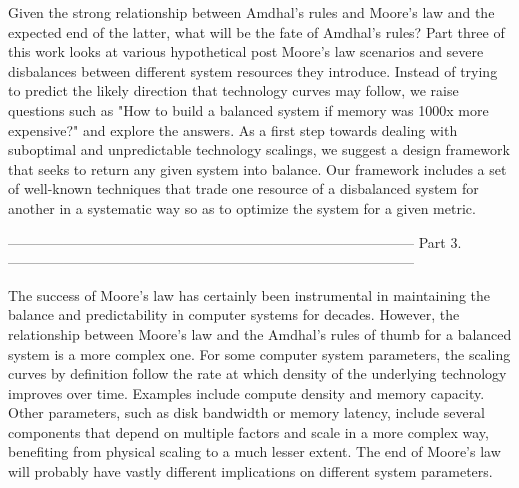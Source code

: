 Given the strong relationship between Amdhal's rules and Moore's law and the expected end of the latter, what will be the fate of Amdhal's rules? Part three of this work looks at various hypothetical post Moore's law scenarios and severe disbalances between different system resources they introduce. Instead of trying to predict the likely direction that technology curves may follow, we raise questions such as "How to build a balanced system if memory was 1000x more expensive?" and explore the answers. As a first step towards dealing with suboptimal and unpredictable technology scalings, we suggest a design framework that seeks to return any given system into balance. Our framework includes a set of well-known techniques that trade one resource of a disbalanced system for another in a systematic way so as to optimize the system for a given metric. 



---------------------------------------------------------------------------------------
Part 3.
---------------------------------------------------------------------------------------

The success of Moore's law has certainly been instrumental in maintaining the balance and predictability in computer systems for decades. However, the relationship between Moore's law and the Amdhal's rules of thumb for a balanced system is a more complex one. For some computer system parameters, the scaling curves by definition follow the rate at which density of the underlying technology improves over time. Examples include compute density and memory capacity. Other parameters, such as disk bandwidth or memory latency, include several components that depend on multiple factors and scale in a more complex way, benefiting from physical scaling to a much lesser extent. The end of Moore's law will probably have vastly different implications on different system parameters. 

